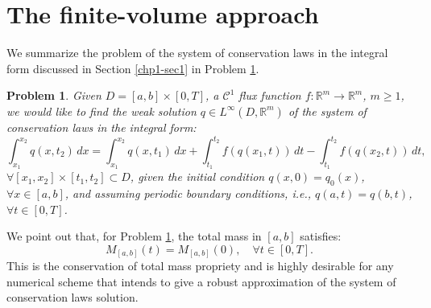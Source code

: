 \section{The finite-volume approach}
\label{chp1-sec2}
We summarize the problem of the system of conservation laws in the integral form 
discussed in Section \ref{chp1-sec1} in Problem \ref{chp1-sec2-prob1}.

\theoremstyle{plain} %
\newtheorem{prob}{Problem}[chapter]

\begin{prob}
	\label{chp1-sec2-prob1}
	Given $ D = [a,b] \times [0,T]$, a $\mathcal{C}^1$ 
	flux function ${f}: \mathbb{R}^m \to \mathbb{R}^m $,
	$m \geq 1$, we would like to find the weak solution
	$ {q} \in L^{\infty}(D, \mathbb{R}^m)$ 
	of the system of conservation laws in the integral form:
	\begin{equation*}
	        \int_{x_1}^{x_2} {q}(x, t_2) \,dx = 
       		\int_{x_1}^{x_2} {q}(x, t_1) \,dx + 
        	\int_{t_1}^{t_2} {f}({q}(x_1, t)) \,dt -
		\int_{t_1}^{t_2}{f}({q}(x_2, t)) \,dt ,
	\end{equation*}
	$\forall [x_1, x_2]\times[t_1, t_2] \subset D$, 
	given the initial condition 
	${q}(x,0) = {q}_0(x)$, $\forall x \in [a,b]$, 
	and assuming periodic boundary conditions, 
	\textit{i.e.}, ${q}(a,t) = {q}(b,t)$, $\forall t \in [0,T]$.
\end{prob}

We point out that, for Problem \ref{chp1-sec2-prob1}, 
the total mass in $[a,b]$ satisfies: 
\begin{equation}
	{M}_{[a,b]}(t) = {M}_{[a,b]}(0), \quad \forall t \in [0,T].
\end{equation}
This is the conservation of total mass propriety and is highly desirable
for any numerical scheme that intends to give a robust approximation of the 
system of conservation laws solution.

